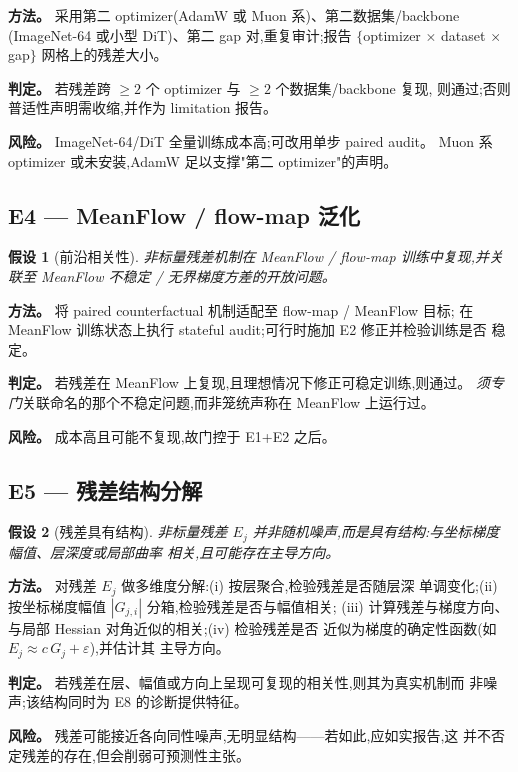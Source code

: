 \documentclass[UTF8,11pt,a4paper]{ctexart}
\newtheorem{hypothesis}{假设}[section]
\begin{document}
\textbf{方法。} 采用第二 optimizer(AdamW 或 Muon 系)、第二数据集/backbone
(ImageNet-64 或小型 DiT)、第二 gap 对,重复审计;报告
$\{$optimizer $\times$ dataset $\times$ gap$\}$ 网格上的残差大小。

\textbf{判定。} 若残差跨 $\geq2$ 个 optimizer 与 $\geq2$ 个数据集/backbone 复现,
则通过;否则普适性声明需收缩,并作为 limitation 报告。

\textbf{风险。} ImageNet-64/DiT 全量训练成本高;可改用单步 paired audit。
Muon 系 optimizer 或未安装,AdamW 足以支撑"第二 optimizer"的声明。

\subsection{E4 --- MeanFlow / flow-map 泛化}
\begin{hypothesis}[前沿相关性]
\label{hyp:E4}
非标量残差机制在 MeanFlow / flow-map 训练中复现,并关联至 MeanFlow 不稳定 /
无界梯度方差的开放问题。
\end{hypothesis}

\textbf{方法。} 将 paired counterfactual 机制适配至 flow-map / MeanFlow 目标;
在 MeanFlow 训练状态上执行 stateful audit;可行时施加 E2 修正并检验训练是否
稳定。

\textbf{判定。} 若残差在 MeanFlow 上复现,且理想情况下修正可稳定训练,则通过。
\emph{须专门}关联命名的那个不稳定问题,而非笼统声称在 MeanFlow 上运行过。

\textbf{风险。} 成本高且可能不复现,故门控于 E1+E2 之后。

\subsection{E5 --- 残差结构分解}
\begin{hypothesis}[残差具有结构]
\label{hyp:E5}
非标量残差 $E_j$ 并非随机噪声,而是具有结构:与坐标梯度幅值、层深度或局部曲率
相关,且可能存在主导方向。
\end{hypothesis}

\textbf{方法。} 对残差 $E_j$ 做多维度分解:(i) 按层聚合,检验残差是否随层深
单调变化;(ii) 按坐标梯度幅值 $|G_{j,i}|$ 分箱,检验残差是否与幅值相关;
(iii) 计算残差与梯度方向、与局部 Hessian 对角近似的相关;(iv) 检验残差是否
近似为梯度的确定性函数(如 $E_j \approx c\,G_j + \varepsilon$),并估计其
主导方向。

\textbf{判定。} 若残差在层、幅值或方向上呈现可复现的相关性,则其为真实机制而
非噪声;该结构同时为 E8 的诊断提供特征。

\textbf{风险。} 残差可能接近各向同性噪声,无明显结构——若如此,应如实报告,这
并不否定残差的存在,但会削弱可预测性主张。
\end{document}
